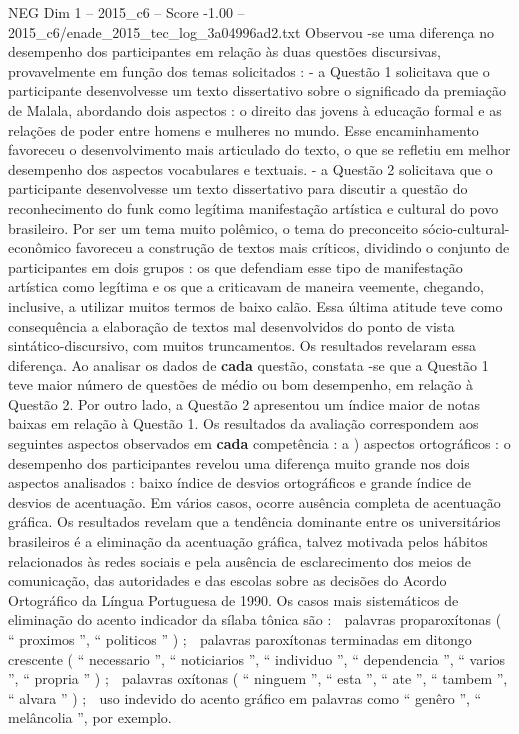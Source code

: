 \begin{textsample}{NEG Dim 1 – 2015\_c6 – Score -1.00 – 2015\_c6/enade\_2015\_tec\_log\_3a04996ad2.txt}
Observou -se uma diferença no desempenho dos participantes em relação às duas questões discursivas, provavelmente em função dos temas solicitados : - a Questão 1 solicitava que o participante desenvolvesse um texto dissertativo sobre o significado da premiação de Malala, abordando dois aspectos : o direito das jovens à educação formal e as relações de poder entre homens e mulheres no mundo.
Esse encaminhamento favoreceu o desenvolvimento mais articulado do texto, o que se refletiu em melhor desempenho dos aspectos vocabulares e textuais. - a Questão 2 solicitava que o participante desenvolvesse um texto dissertativo para discutir a questão do reconhecimento do funk como legítima manifestação artística e cultural do povo brasileiro.
Por ser um tema muito polêmico, o tema do preconceito sócio-cultural-econômico favoreceu a construção de textos mais críticos, dividindo o conjunto de participantes em dois grupos : os que defendiam esse tipo de manifestação artística como legítima e os que a criticavam de maneira veemente, chegando, inclusive, a utilizar muitos termos de baixo calão.
Essa última atitude teve como consequência a elaboração de textos mal desenvolvidos do ponto de vista sintático-discursivo, com muitos truncamentos.
Os resultados revelaram essa diferença.
Ao analisar os dados de \textbf{cada} questão, constata -se que a Questão 1 teve maior número de questões de médio ou bom desempenho, em relação à Questão 2.
Por outro lado, a Questão 2 apresentou um índice maior de notas baixas em relação à Questão 1.
Os resultados da avaliação correspondem aos seguintes aspectos observados em \textbf{cada} competência : a ) aspectos ortográficos : o desempenho dos participantes revelou uma diferença muito grande nos dois aspectos analisados : baixo índice de desvios ortográficos e grande índice de desvios de acentuação.
Em vários casos, ocorre ausência completa de acentuação gráfica.
Os resultados revelam que a tendência dominante entre os universitários brasileiros é a eliminação da acentuação gráfica, talvez motivada pelos hábitos relacionados às redes sociais e pela ausência de esclarecimento dos meios de comunicação, das autoridades e das escolas sobre as decisões do Acordo Ortográfico da Língua Portuguesa de 1990.
Os casos mais sistemáticos de eliminação do acento indicador da sílaba tônica são :  palavras proparoxítonas ( “ proximos ”, “ politicos ” ) ;  palavras paroxítonas terminadas em ditongo crescente ( “ necessario ”, “ noticiarios ”, “ individuo ”, “ dependencia ”, “ varios ”, “ propria ” ) ;  palavras oxítonas ( “ ninguem ”, “ esta ”, “ ate ”, “ tambem ”, “ alvara ” ) ;  uso indevido do acento gráfico em palavras como “ genêro ”, “ melâncolia ”, por exemplo.

\end{textsample}

